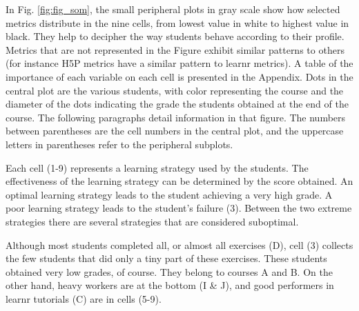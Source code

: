 \documentclass{aims}
\theoremstyle{definition}
\begin{document}
In Fig. \ref {fig:fig_som}, the small peripheral plots in gray scale
show how selected metrics distribute in the nine cells, from lowest
value in white to highest value in black. They help to decipher the way
students behave according to their profile. Metrics that are not
represented in the Figure exhibit similar patterns to others (for
instance H5P metrics have a similar pattern to learnr metrics). A table
of the importance of each variable on each cell is presented in the
Appendix. Dots in the central plot are the various students, with color
representing the course and the diameter of the dots indicating the
grade the students obtained at the end of the course. The following
paragraphs detail information in that figure. The numbers between
parentheses are the cell numbers in the central plot, and the uppercase
letters in parentheses refer to the peripheral subplots.

Each cell (1-9) represents a learning strategy used by the students. The
effectiveness of the learning strategy can be determined by the score
obtained. An optimal learning strategy leads to the student achieving a
very high grade. A poor learning strategy leads to the student's failure
(3). Between the two extreme strategies there are several strategies
that are considered suboptimal.

Although most students completed all, or almost all exercises (D), cell
(3) collects the few students that did only a tiny part of these
exercises. These students obtained very low grades, of course. They
belong to courses A and B. On the other hand, heavy workers are at the
bottom (I \& J), and good performers in learnr tutorials (C) are in
cells (5-9).
\end{document}
